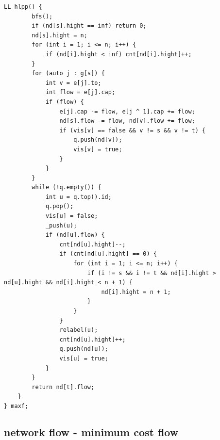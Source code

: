 \documentclass[UTF8, a4paper, titlepage, twoside]{ctexart}
\begin{document}
\begin{lstlisting}[style=cpp]
    LL hlpp() {
        bfs();
        if (nd[s].hight == inf) return 0;
        nd[s].hight = n;
        for (int i = 1; i <= n; i++) {
            if (nd[i].hight < inf) cnt[nd[i].hight]++;
        }
        for (auto j : g[s]) {
            int v = e[j].to;
            int flow = e[j].cap;
            if (flow) {
                e[j].cap -= flow, e[j ^ 1].cap += flow;
                nd[s].flow -= flow, nd[v].flow += flow;
                if (vis[v] == false && v != s && v != t) {
                    q.push(nd[v]);
                    vis[v] = true;
                }
            }
        }
        while (!q.empty()) {
            int u = q.top().id;
            q.pop();
            vis[u] = false;
            _push(u);
            if (nd[u].flow) {
                cnt[nd[u].hight]--;
                if (cnt[nd[u].hight] == 0) {
                    for (int i = 1; i <= n; i++) {
                        if (i != s && i != t && nd[i].hight > nd[u].hight && nd[i].hight < n + 1) {
                            nd[i].hight = n + 1;
                        }
                    }
                }
                relabel(u);
                cnt[nd[u].hight]++;
                q.push(nd[u]);
                vis[u] = true;
            }
        }
        return nd[t].flow;
    }
} maxf;
\end{lstlisting}

\subsection{ network flow - minimum cost flow }
\end{document}
